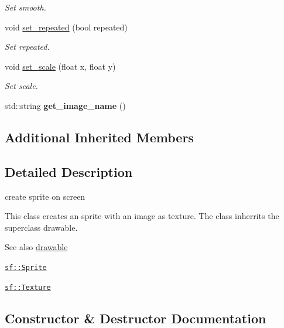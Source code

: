 \begin{DoxyCompactItemize}
\begin{DoxyCompactList}\small\item\em Set smooth. \end{DoxyCompactList}\item 
void \hyperlink{classimage__from__file_abaf0ebde2771171fdf91b55f4f6c5aa6}{set\+\_\+repeated} (bool repeated)
\begin{DoxyCompactList}\small\item\em Set repeated. \end{DoxyCompactList}\item 
void \hyperlink{classimage__from__file_a698cd91783bb6c2211ea5a3702ca60a8}{set\+\_\+scale} (float x, float y)
\begin{DoxyCompactList}\small\item\em Set scale. \end{DoxyCompactList}\item 
\mbox{\label{classimage__from__file_adb7af19d3d997ab5c0d5b7c8dfe32ded}} 
std\+::string {\bfseries get\+\_\+image\+\_\+name} ()
\end{DoxyCompactItemize}
\subsection*{Additional Inherited Members}


\subsection{Detailed Description}
create sprite on screen 

This class creates an sprite with an image as texture. The class inherrits the superclass drawable.

\begin{DoxySeeAlso}{See also}
\hyperlink{classdrawable}{drawable} 

\href{https://www.sfml-dev.org/documentation/2.0/classsf_1_1Sprite.php }{\tt sf\+::\+Sprite} 

\href{https://www.sfml-dev.org/documentation/2.0/classsf_1_1Texture.php}{\tt sf\+::\+Texture} 
\end{DoxySeeAlso}


\subsection{Constructor \& Destructor Documentation}
\mbox{\label{classimage__from__file_a08fd7ad55a2eb520242e31ff3cdf2663}} 
